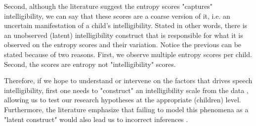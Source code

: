 Second, although the literature suggest the entropy scores "captures" intelligibility, we can say that these scores are a coarse version of it, i.e. an uncertain manifestation of a child's intelligibility. Stated in other words, there is an unobserved (latent) intelligibility construct that is responsible for what it is observed on the entropy scores and their variation. Notice the previous can be stated because of two reasons. First, we observe multiple entropy scores per child. Second, the scores are entropy not "intelligibility" scores. 

Therefore, if we hope to understand or intervene on the factors that drives speech intelligibility, first one needs to "construct" an intelligibility scale from the data \citep{Carroll_2006}, allowing us to test our research hypotheses at the appropriate (children) level. Furthermore, the literature emphasize that failing to model this phenomena as a "latent construct" would also lead us to incorrect inferences \citep{deHaan_et_al_2019}.

